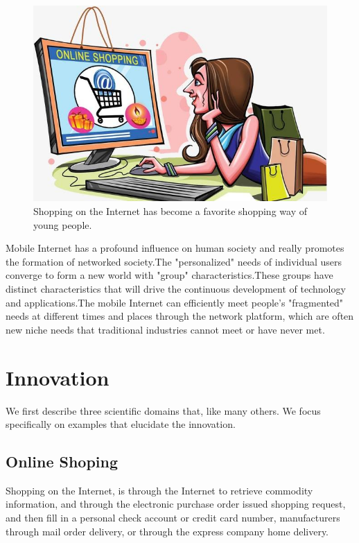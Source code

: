 \documentclass{elsarticle}
\begin{document}
\begin{figure}[ht!]
	\centering
	\includegraphics[trim=0in 0in 0in 0in,clip,width=0.75\columnwidth]{onlineshopping.jpg}
	\caption{Shopping on the Internet has become a favorite shopping way of young people.
		\label{fig:on_shop}}
\end{figure}

Mobile Internet has a profound influence on human society and really promotes the formation of networked society.The "personalized" needs of individual users converge to form a new world with "group" characteristics\cite{SSMSO,DBLP}.These groups have distinct characteristics that will drive the continuous development of technology and applications\cite{extend}.The mobile Internet can efficiently meet people's "fragmented" needs at different times and places through the network platform, which are often new niche needs that traditional industries cannot meet or have never met.

\section{Innovation}\label{sec:inno}
We first describe three scientific domains that, like many others. We 
focus specifically on examples that elucidate the innovation. 

\subsection{Online Shoping}
Shopping on the Internet, is through the Internet to retrieve commodity information, and through the electronic purchase order issued shopping request, and then fill in a personal check account or credit card number, manufacturers through mail order delivery, or through the express company home delivery.
\end{document}
